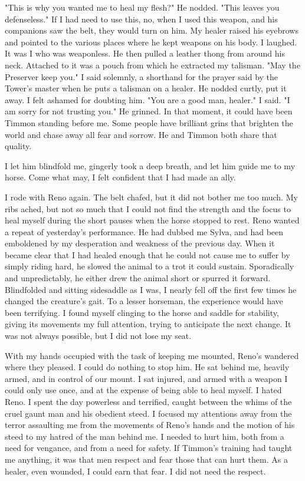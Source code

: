 \documentclass{article}
\begin{document}
"This is why you wanted me to heal my flesh?" He nodded. "This leaves you defenseless." If I had need to use this, no, when I used this weapon, and his companions saw the belt, they would turn on him. My healer raised his eyebrows and pointed to the various places where he kept weapons on his body. I laughed. It was I who was weaponless. He then pulled a leather thong from around his neck. Attached to it was a pouch from which he extracted my talisman. "May the Preserver keep you." I said solemnly, a shorthand for the prayer said by the Tower's master when he puts a talisman on a healer. He nodded curtly, put it away. I felt ashamed for doubting him. "You are a good man, healer." I said. "I am sorry for not trusting you." He grinned. In that moment, it could have been Timmon standing before me. Some people have brilliant grins that brighten the world and chase away all fear and sorrow. He and Timmon both share that quality. 

I let him blindfold me, gingerly took a deep breath, and let him guide me to my horse. Come what may, I felt confident that I had made an ally.

I rode with Reno again. The belt chafed, but it did not bother me too much. My ribs ached, but not so much that I could not find the strength and the focus to heal myself during the short pauses when the horse stopped to rest. Reno wanted a repeat of yesterday's performance. He had dubbed me Sylva, and had been emboldened by my desperation and weakness of the previous day. When it became clear that I had healed enough that he could not cause me to suffer by simply riding hard, he slowed the animal to a trot it could sustain. Sporadically and unpredictably, he either drew the animal short or spurred it forward. Blindfolded and sitting sidesaddle as I was, I nearly fell off the first few times he changed the creature's gait. To a lesser horseman, the experience would have been terrifying. I found myself clinging to the horse and saddle for stability, giving its movements my full attention, trying to anticipate the next change. It was not always possible, but I did not lose my seat.

With my hands occupied with the task of keeping me mounted, Reno's wandered where they pleased. I could do nothing to stop him. He sat behind me, heavily armed, and in control of our mount. I sat injured, and armed with a weapon I could only use once, and at the expense of being able to heal myself. I hated Reno. I spent the day powerless and terrified, caught between the whims of the cruel gaunt man and his obedient steed. I focused my attentions away from the terror assaulting me from the movements of Reno's hands and the motion of his steed to my hatred of the man behind me. I needed to hurt him, both from a need for vengance, and from a need for safety. If Timmon's training had taught me anything, it was that men respect and fear those that can hurt them. As a healer, even wounded, I could earn that fear. I did not need the respect.
\end{document}
